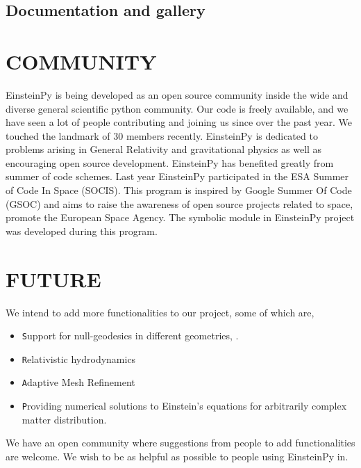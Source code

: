 \documentclass{aastex63}
\begin{document}
\subsection{ Documentation and gallery} \label{subsec:  Documentation and gallery}

\section{COMMUNITY} \label{sec:COMMUNITY}
EinsteinPy is being developed as an open source community inside the wide and diverse general scientific python community. Our code is freely available, and we have seen a lot of people contributing and joining us since over the past year.
We touched the landmark of 30 members recently. EinsteinPy is dedicated to problems arising in General Relativity and gravitational physics as well as encouraging open source development. EinsteinPy has benefited greatly from summer of code schemes. Last year EinsteinPy participated in the ESA Summer of Code In Space (SOCIS). This program is inspired by Google Summer Of Code (GSOC) and aims to raise the awareness of open source projects related to space, promote the European Space Agency. The symbolic module in EinsteinPy project was developed during this program.

\section{FUTURE} \label{sec:FUTURE}
We intend to add more functionalities to our project, some of which are, 
\begin{itemize}
\item \texttt Support for null-geodesics in different geometries, . 
\item \texttt Relativistic hydrodynamics
\item \texttt Adaptive Mesh Refinement 
\item \texttt Providing numerical solutions to Einstein’s equations for arbitrarily complex matter distribution.
\end{itemize}

We have an open community where suggestions from people to add functionalities are welcome. We wish to be as helpful as possible to people using EinsteinPy in.
\end{document}
